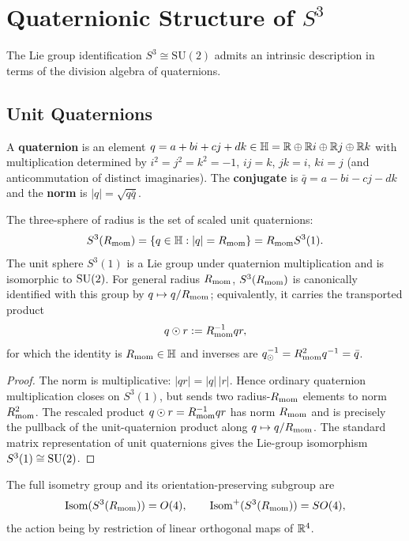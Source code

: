 \documentclass[11pt]{article}
\begin{document}
\section{\texorpdfstring{Quaternionic Structure of $S^3$}{Quaternionic Structure of S3}}
\label{p1:sec:quaternions}

The Lie group identification $S^3 \cong \mathrm{SU}(2)$ admits an intrinsic description in terms of the division algebra of quaternions.

\subsection{Unit Quaternions}

\begin{definition}[Quaternions]
\label{p1:def:quaternions}
A \textbf{quaternion} is an element $q = a + bi + cj + dk \in \mathbb{H} = \mathbb{R} \oplus \mathbb{R} i \oplus \mathbb{R} j \oplus \mathbb{R} k$ with multiplication determined by $i^2 = j^2 = k^2 = -1$, $ij = k$, $jk = i$, $ki = j$ (and anticommutation of distinct imaginaries). The \textbf{conjugate} is $\bar{q} = a - bi - cj - dk$ and the \textbf{norm} is $|q| = \sqrt{q\bar{q}}$.
\end{definition}

\begin{proposition}
\label{p1:prop:scaled-unit-quaternions}
The three-sphere of radius \Rmom is the set of scaled unit quaternions:
\[
S^3(R_{\mathrm{mom}}) = \{ q \in \mathbb{H} : |q| = R_{\mathrm{mom}} \}=R_{\mathrm{mom}} S^3(1).
\]
The unit sphere $S^3(1)$ is a Lie group under quaternion multiplication and is
isomorphic to $\mathrm{SU}(2)$.  For general radius $R_{\mathrm{mom}}$, $S^3(R_{\mathrm{mom}})$ is canonically
identified with this group by $q\mapsto q/R_{\mathrm{mom}}$; equivalently, it carries the
transported product
\[
q\odot r:=R_{\mathrm{mom}}^{-1}qr,
\]
for which the identity is $R_{\mathrm{mom}}\in\mathbb{H}$ and inverses are
$q^{-1}_{\odot}=R_{\mathrm{mom}}^2 q^{-1}=\bar q$.
\cite{conwaysmith2003quaternions,helgason1984groups}
\end{proposition}
\begin{proof}
The norm is multiplicative: $|qr|=|q|\,|r|$. Hence ordinary quaternion
multiplication closes on $S^3(1)$, but sends two radius-$R_{\mathrm{mom}}$ elements to norm
$R_{\mathrm{mom}}^2$. The rescaled product $q\odot r=R_{\mathrm{mom}}^{-1}qr$ has norm $R_{\mathrm{mom}}$ and is
precisely the pullback of the unit-quaternion product along $q\mapsto q/R_{\mathrm{mom}}$.
The standard matrix representation of unit quaternions gives the Lie-group
isomorphism $S^3(1)\cong\mathrm{SU}(2)$.
\end{proof}

\begin{proposition}
\label{p1:prop:isom-s3-so4}
The full isometry group and its orientation-preserving subgroup are
\[
 \operatorname{Isom}(S^3(R_{\mathrm{mom}}))=O(4),\qquad
 \operatorname{Isom}^+(S^3(R_{\mathrm{mom}}))=SO(4),
\]
the action being by restriction of linear orthogonal maps of \(\mathbb{R}^4\).
\end{proposition}
\end{document}
